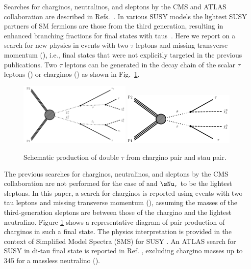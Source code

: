 Searches for charginos, neutralinos, and sleptons by the CMS and ATLAS collaboration are described in Refs.~\cite{Khachatryan:2014qwa,Khachatryan:2014mma,Khachatryan:2015kxa,Aad:2014nua,Aad:2014vma}.
In various SUSY models  the lightest SUSY partners of SM fermions are those from the third generation,
resulting in enhanced branching fractions for final states with taus~\cite{Martin:1997ns}.  Here we report on a search for new physics in events
with two $\tau$ leptons and missing transverse momentum (\MPT), i.e., final states that were not explicitly targeted in the previous publications.
Two $\tau$ leptons can be generated in the decay chain of the scalar $\tau$ leptons (\sTau) or charginos (\PSGcpDo) as shown in Fig.~\ref{fig:Productions}.
\begin{figure}[!hHtb]
\centering
\includegraphics[width=0.49\textwidth]{Introductionfigs/TChipmSlepSnu.pdf}
\includegraphics[width=0.49\textwidth]{Introductionfigs/TSlepSlep.pdf}
\caption{Schematic production of double $\tau$ from chargino pair and stau pair.}
\label{fig:Productions}
\end{figure}


The previous searches for charginos, neutralinos,
and sleptons by the CMS collaboration \cite{Khachatryan:2014qwa} are not performed for the case of \stau and $\sNu_\tau$
to be the lightest sleptons. In this paper, a search for charginos is reported using events with two tau leptons and
missing transverse momentum (\MPT), assuming the masses of the third-generation sleptons are between those of the
chargino and the lightest neutralino.
Figure \ref{fig:Productions}
shows a representative diagram of pair production of charginos in such a final state. 
The physics interpretation is provided in the context of Simplified Model Spectra (SMS) for SUSY \cite{Alwall:2008ag,alves:sms}.
An ATLAS search for SUSY in di-tau final state is reported in Ref. \cite{Aad:2014yka}, excluding chargino masses up to 345 \GeV 
for a massless neutralino (\PSGczDo).

